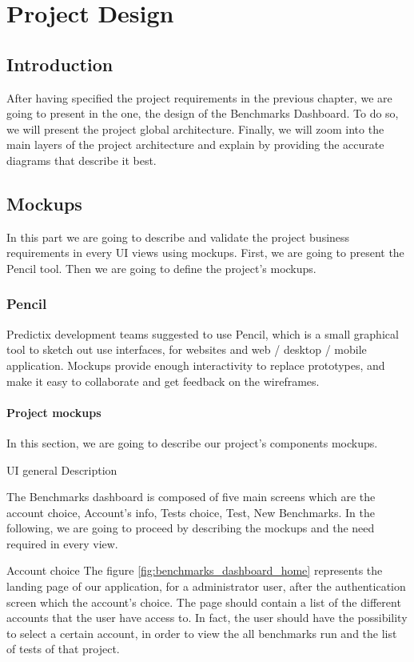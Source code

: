 \chapter{Project Design}

\section{Introduction}
After having specified the project requirements in the  previous chapter, we are
going to present in the one,  the design of the Benchmarks Dashboard. To do so,
we will present the project global architecture. Finally, we will zoom into the
main layers of the project architecture and explain by providing the accurate
diagrams that describe it best.

\section{Mockups}
In this part we are going to describe and validate the project business
requirements in every UI views using mockups. First, we are going to present the
Pencil tool. Then we are going to define the project's mockups.

\subsection{Pencil}
Predictix development teams suggested to use Pencil, which is a small graphical
tool to sketch out use interfaces, for websites and web / desktop / mobile
application. Mockups provide enough interactivity to replace prototypes, and
make it easy to collaborate and get feedback on the wireframes.

\subsubsection{Project mockups}
In this section, we are going to describe our project's components mockups.

UI general Description

The Benchmarks dashboard is composed of five main screens which are the account
choice, Account's info, Tests choice, Test, New Benchmarks. In the following,
we are going to proceed by describing the mockups and the need required in every
view.

Account choice
The figure
\hyperref[fig:benchmarks_dashboard_home]{\ref{fig:benchmarks_dashboard_home}}
represents the landing page of our application, for a administrator user,
after the authentication screen which the account's choice. The page should
contain a list of the different accounts that the user have access to. In fact,
the user should have the possibility to select a certain account, in order to
view the all benchmarks run and the list of tests of that project.

